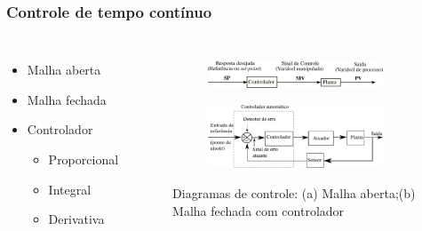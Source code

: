 \begin{frame}
\begin{columns}
\end{columns}
\end{frame}


\begin{frame}
\frametitle{Controle de tempo contínuo}
\begin{columns}
	\begin{itemize}
	\item Malha aberta
	\item Malha fechada
	\item Controlador
		\begin{itemize}
		\item Proporcional
		\item Integral
		\item Derivativa
		\end{itemize}
	\end{itemize}
	
	\begin{figure}[h]
     \centering
     \captionsetup{width=\textwidth,font=footnotesize,textfont=bf}
     \begin{subfigure}[b]{\textwidth}
 	\centering
         \includegraphics[width=\textwidth,height=\textheight,keepaspectratio]{Figuras/MalhaAberta.pdf}
         \caption{\centering \label{fig:jkl}}
     \end{subfigure}
     
     \begin{subfigure}[b]{\textwidth}
 	\centering
         \includegraphics[width=\textwidth,height=5\textheight,keepaspectratio]{Figuras/Controlador.pdf}
         \caption{\centering \label{fig:ppolk}}
     \end{subfigure}
	\caption{Diagramas de controle: (a) Malha aberta;(b) Malha fechada com controlador}
 \end{figure}
	
\end{columns}
\end{frame}

